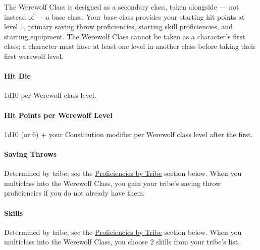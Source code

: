 \documentclass[twocolumn]{dndbook}
\begin{document}
The Werewolf Class is designed as a secondary class, taken alongside --- not instead of --- a base class.
Your base class provides your starting hit points at level 1, primary saving throw proficiencies, starting skill proficiencies, and starting equipment.
The Werewolf Class cannot be taken as a character's first class; a character must have at least one level in another class before taking their first werewolf level.\par

\paragraph*{Hit Die} 1d10 per Werewolf class level.
\paragraph*{Hit Points per Werewolf Level} 1d10 (or 6) + your Constitution modifier per Werewolf class level after the first.
\paragraph*{Saving Throws} Determined by tribe; see the \hyperref[sec:proficiencies-by-tribe]{Proficiencies by Tribe} section below. When you multiclass into the Werewolf Class, you gain your tribe's saving throw proficiencies if you do not already have them.
\paragraph*{Skills} Determined by tribe; see the \hyperref[sec:proficiencies-by-tribe]{Proficiencies by Tribe} section below. When you multiclass into the Werewolf Class, you choose 2 skills from your tribe's list.
\end{document}
